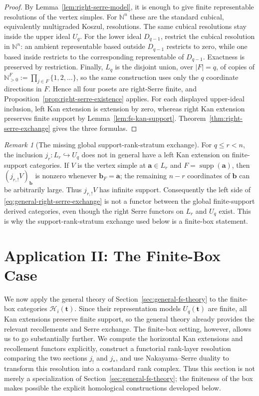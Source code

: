 \documentclass[12pt,reqno]{amsart}
\theoremstyle{definition}
\theoremstyle{remark}
\newtheorem{remark}[theorem]{Remark}
\begin{document}
\begin{proof}
By Lemma~\ref{lem:right-serre-model}, it is enough to give finite
representable resolutions of the vertex simples.  For $\mathbb N^n$ these
are the standard cubical, equivalently multigraded Koszul, resolutions.  The
same cubical resolutions stay inside the upper ideal $U_q$.  For the lower
ideal $D_{q-1}$, restrict the cubical resolution in $\mathbb N^n$: an ambient
representable based outside $D_{q-1}$ restricts to zero, while one based
inside restricts to the corresponding representable of $D_{q-1}$.  Exactness
is preserved by restriction.  Finally, $L_q$ is the disjoint union, over
$|F|=q$, of copies of
$\mathbb N_{>0}^F:=\prod_{j\in F}\{1,2,\ldots\}$, so the same construction
uses only the $q$ coordinate directions in $F$.  Hence all four posets are
right-Serre finite, and Proposition~\ref{prop:right-serre-existence}
applies.  For each displayed upper-ideal inclusion, left Kan extension is
extension by zero, whereas right Kan extension preserves finite support by
Lemma~\ref{lem:fs-kan-support}.  Theorem~\ref{thm:right-serre-exchange} gives
the three formulas.
\end{proof}

\begin{remark}[The missing global support-rank-stratum exchange]
\label{rem:global-rank-kan-failure}
For $q\le r<n$, the inclusion $j_r:L_r\hookrightarrow U_q$ does not in
general have a left Kan extension on finite-support categories.  If $V$ is
the vertex simple at $\mathbf a\in L_r$ and
$F=\operatorname{supp}(\mathbf a)$, then $(j_{r,!}V)_{\mathbf b}$ is nonzero
whenever $\mathbf b_F=\mathbf a$; the remaining $n-r$ coordinates of
$\mathbf b$ can be arbitrarily large.  Thus $j_{r,!}V$ has infinite support.
Consequently the left side of
\eqref{eq:general-right-serre-exchange} is not a functor between the global
finite-support derived categories, even though the right Serre functors on
$L_r$ and $U_q$ exist.  This is why the support-rank-stratum exchange used below is
a finite-box statement.
\end{remark}

\section{Application II: The Finite-Box Case}
\label{sec:finite-box-recollement}

We now apply the general theory of Section~\ref{sec:general-fs-theory} to the
finite-box categories $\mathcal H_i(\mathbf t)$.  Since their representation
models $U_q(\mathbf t)$ are finite, all Kan extensions preserve finite support,
so the general theory already provides the relevant recollements and Serre
exchange.  The finite-box setting, however, allows us to go substantially
further.  We compute the horizontal Kan extensions and recollement functors
explicitly, construct a functorial rank-layer resolution comparing the two
sections $j_!$ and $j_*$, and use Nakayama--Serre duality to transform this
resolution into a costandard rank complex.  Thus this section is not merely a
specialization of Section~\ref{sec:general-fs-theory}; the finiteness of the box
makes possible the explicit homological constructions developed below.
\end{document}
